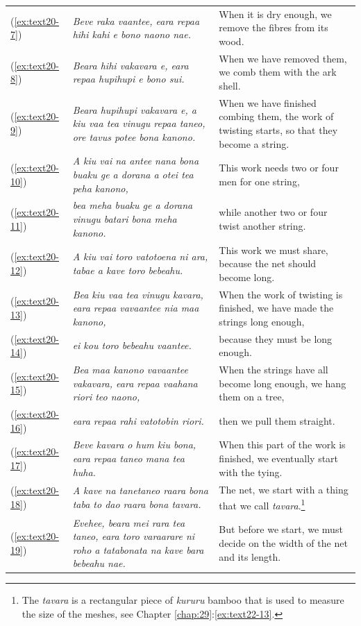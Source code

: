\documentclass[output=paper]{langscibook}
\begin{document}
\begin{xltabular}{\textwidth}{lXX}
	(\ref{ex:text20-7})&\textit{Beve raka vaantee, eara repaa hihi kahi e bono naono nae.}&When it is dry enough, we remove the fibres from its wood.\\
	(\ref{ex:text20-8})&\textit{Beara hihi vakavara e, eara repaa hupihupi e bono sui.}&When we have removed them, we comb them with the ark shell.\\
	(\ref{ex:text20-9})&\textit{Beara hupihupi vakavara e, a kiu vaa tea vinugu repaa taneo, ore tavus potee bona kanono.}&When we have finished combing them, the work of twisting starts, so that they become a string.\\
	(\ref{ex:text20-10})&\textit{A kiu vai na antee nana bona buaku ge a dorana a otei tea peha kanono,}&This work needs two or four men for one string,\\
	(\ref{ex:text20-11})&\textit{bea meha buaku ge a dorana vinugu batari bona meha kanono.}&while another two or four twist another string.\\
	(\ref{ex:text20-12})&\textit{A kiu vai toro vatotoena ni ara, tabae a kave toro bebeahu.}&This work we must share, because the net should become long.\\
	(\ref{ex:text20-13})&\textit{Bea kiu vaa tea vinugu kavara, eara repaa vavaantee nia maa kanono,}&When the work of twisting is finished, we have made the strings long enough,\\
	(\ref{ex:text20-14})&\textit{ei kou toro bebeahu vaantee.}&because they must be long enough.\\
	(\ref{ex:text20-15})&\textit{Bea maa kanono vavaantee vakavara, eara repaa vaahana riori teo naono,}&When the strings have all become long enough, we hang them on a tree,\\
	(\ref{ex:text20-16})&\textit{eara repaa rahi vatotobin riori.}&then we pull them straight.\\
	(\ref{ex:text20-17})&\textit{Beve kavara o hum kiu bona, eara repaa taneo mana tea huha.}&When this part of the work is finished, we eventually start with the tying.\\
	(\ref{ex:text20-18})&\textit{A kave na tanetaneo raara bona taba to dao raara bona tavara.}&The net, we start with a thing that we call \textit{tavara}.\footnote{The \textit{tavara} is a rectangular piece of \textit{kururu} bamboo that is used to measure the size of the meshes, see Chapter \ref{chap:29}:\ref{ex:text22-13}.}\\
	(\ref{ex:text20-19})&\textit{Evehee, beara mei rara tea taneo, eara toro varaarare ni roho a tatabonata na kave bara bebeahu nae.}&But before we start, we must decide on the width of the net and its length.\\
\end{xltabular}	
\end{document}
